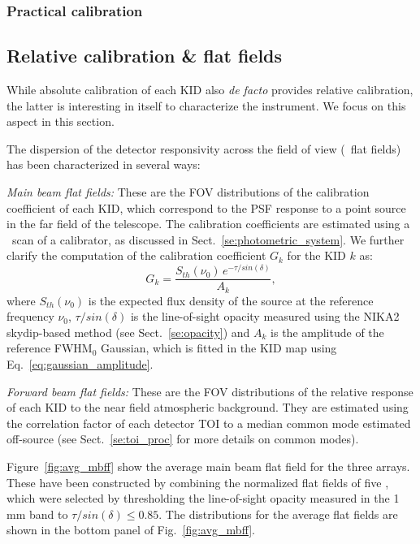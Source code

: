 \subsubsection{Practical calibration}



\subsection{Relative calibration \& flat fields}
\label{se:flat_field}
While absolute calibration of each KID also \emph{de facto} provides
relative calibration, the latter is interesting in itself to
characterize the instrument. We focus on this aspect in this
section.

The dispersion of the detector responsivity across the field of view (\aka\ flat
fields) has been characterized in several ways:

\noindent \emph{Main beam flat fields:} These are the FOV distributions
of the calibration coefficient of each KID, which correspond to the
PSF response to a point source in the far field of the
telescope. The calibration coefficients are estimated using a \bm\ scan
of a calibrator, as discussed in Sect.~\ref{se:photometric_system}. We
further clarify the computation of the calibration coefficient $G_k$
for the KID $k$ as:
\begin{equation}
  G_k = \frac{S_{th}(\nu_0)\, e^{-\tau/sin(\delta)}}{A_k}, 
\end{equation}
where $S_{th}(\nu_0)$ is the expected flux density of the source at
the reference frequency $\nu_0$, $\tau/sin(\delta)$ is the
line-of-sight opacity measured using the NIKA2 skydip-based method
(see Sect.~\ref{se:opacity}) and $A_k$ is the
amplitude of the reference FWHM$_0$ Gaussian, which is fitted in the
KID map using Eq.~\ref{eq:gaussian_amplitude}.

\noindent \emph{Forward beam flat fields:} These are the FOV
distributions of the relative response of
each KID to the near field atmospheric background. They are estimated
using the correlation factor of each detector TOI 
to a median common mode estimated off-source (see Sect.~\ref{se:toi_proc} for
more details on common modes).

Figure~\ref{fig:avg_mbff} %
show the average main beam %
flat field for the three arrays. These have been constructed by
combining the normalized flat fields of five \bms, which were
selected by thresholding the line-of-sight opacity measured in the
1\,mm band to $\tau/sin(\delta) \leq 0.85$. The distributions for the average flat
fields are shown in the bottom panel of Fig.~\ref{fig:avg_mbff}.%


